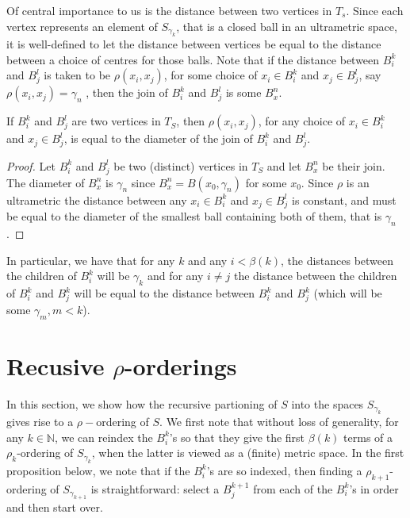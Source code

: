 Of central importance to us is the distance between two vertices in $T_s$. Since each vertex represents an element of $S_{\gamma_k}$, that is a closed ball in an ultrametric space, it is well-defined to let the distance between vertices be equal to the distance between a choice of centres for those balls. Note that if the distance between $B^k_i$ and $B^l_j$ is taken to be $\rho(x_i,x_j)$, for some choice of $x_i \in B^k_i$ and $x_j \in B^l_j$, say $\rho(x_i,x_j)=\gamma_n$ , then the join of  $B^k_i$ and $B^l_j$ is some $B^n_x$. 

\begin{lemma*}
If $B^k_i$ and $B^l_j$ are two vertices in $T_S$, then $\rho(x_i,x_j)$, for any choice of  $x_i \in B^k_i$ and $x_j \in B^l_j$, is equal to the diameter of the join of  $B^k_i$ and $B^l_j$. 
\end{lemma*}

\begin{proof}
Let $B^k_i$ and $B^l_j$ be two (distinct) vertices in $T_S$ and let $B^n_x$ be their join. The diameter of $B^n_x$ is $\gamma_n$ since $B^n_x=B(x_0, \gamma_n)$ for some $x_0$. Since $\rho$ is an ultrametric the distance between any  $x_i \in B^k_i$ and $x_j \in B^l_j$ is constant, and must be equal to the diameter of the smallest ball containing both of them, that is $\gamma_n$.
\end{proof}

In particular, we have that for any $k$ and any $i < \beta(k)$, the distances between the children of $B^k_i$ will be $\gamma_k$ and for any $i \neq j$ the distance between the children of $B^k_i$ and $B^k_j$ will be equal to the distance between  $B^k_i$ and $B^k_j$ (which will be some $\gamma_{m}, m <k$).

\section*{Recusive $\rho$-orderings}
In this section, we show how the recursive partioning of $S$ into the spaces $S_{\gamma_k}$ gives rise to a $\rho-$ordering of $S$. We first note that without loss of generality, for any $k \in \mathbb{N}$, we can reindex the $B^k_i$'s so that they give the first $\beta(k)$ terms of a $\rho_k$-ordering of $S_{\gamma_k}$, when the latter is viewed as a (finite) metric space. In the first proposition below, we note that if the $B^k_i$'s are so indexed, then finding a $\rho_{k+1}$-ordering of $S_{\gamma_{k+1}}$ is straightforward: select a $B^{k+1}_j$ from each of the $B^k_i$'s in order and then start over.  

